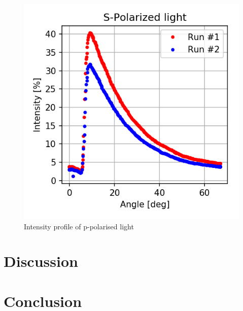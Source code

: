 \documentclass[11pt,a4paper]{article}
\begin{document}
  \begin{figure}[H]
    \center
    \includegraphics[scale=0.8]{scripts/spolar.png}
    \caption{Intensity profile of p-polarised light}
  \end{figure}

\section{\label{sect:discuss}Discussion}

\section{\label{sect:conclusion}Conclusion}



\end{document}
